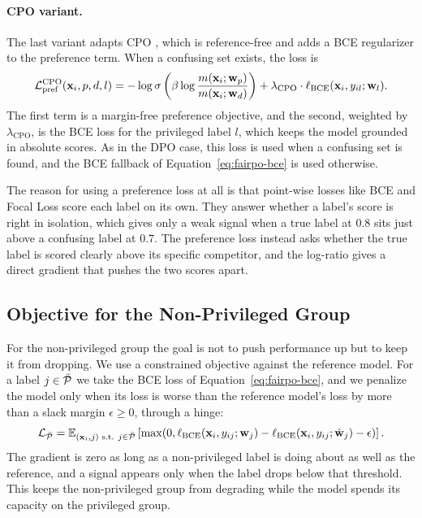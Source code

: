 \paragraph{CPO variant.}
The last variant adapts CPO \citep{xu2024contrastive},
which is reference-free and adds a BCE regularizer to the preference term. When a
confusing set exists, the loss is
\begin{equation}
	\mathcal{L}_{\text{pref}}^{\text{CPO}}(\mathbf{x}_i, p, d, l) = -\log \sigma \left( \beta \log \frac{m(\mathbf{x}_i; \mathbf{w}_p)}{m(\mathbf{x}_i; \mathbf{w}_d)} \right) + \lambda_{\text{CPO}} \cdot \ell_{\text{BCE}}(\mathbf{x}_i, y_{il}; \mathbf{w}_l).
	\label{eq:fairpo-cpo-pref}
\end{equation}
The first term is a margin-free preference objective, and the second, weighted by
$\lambda_{\text{CPO}}$, is the BCE loss for the privileged label $l$, which keeps
the model grounded in absolute scores. As in the DPO case, this loss is used when a
confusing set is found, and the BCE fallback of Equation~\ref{eq:fairpo-bce} is used
otherwise.

The reason for using a preference loss at all is that point-wise losses like BCE
and Focal Loss score each label on its own. They answer whether a label's score is
right in isolation, which gives only a weak signal when a true label at $0.8$ sits
just above a confusing label at $0.7$. The preference loss instead asks whether the
true label is scored clearly above its specific competitor, and the log-ratio gives
a direct gradient that pushes the two scores apart.

\subsection{Objective for the Non-Privileged Group}
\label{subsec:fairpo-nonprivileged}

For the non-privileged group the goal is not to push performance up but to keep it
from dropping. We use a constrained objective against the reference model. For a
label $j \in \bar{\mathcal{P}}$ we take the BCE loss of
Equation~\ref{eq:fairpo-bce}, and we penalize the model only when its loss is worse
than the reference model's loss by more than a slack margin $\epsilon \ge 0$,
through a hinge:
\begin{equation}
	\mathcal{L}_{\bar{\mathcal{P}}} = \mathbb{E}_{(\mathbf{x}_i,j) \text{ s.t. } j \in \bar{\mathcal{P}}} \left[ \max(0, \ell_{\text{BCE}}(\mathbf{x}_i, y_{ij}; \mathbf{w}_j) - \ell_{\text{BCE}}(\mathbf{x}_i, y_{ij}; \hat{\mathbf{w}}_j) - \epsilon) \right].
	\label{eq:fairpo-np-constrained}
\end{equation}
The gradient is zero as long as a non-privileged label is doing about as well as
the reference, and a signal appears only when the label drops below that threshold.
This keeps the non-privileged group from degrading while the model spends its
capacity on the privileged group.


